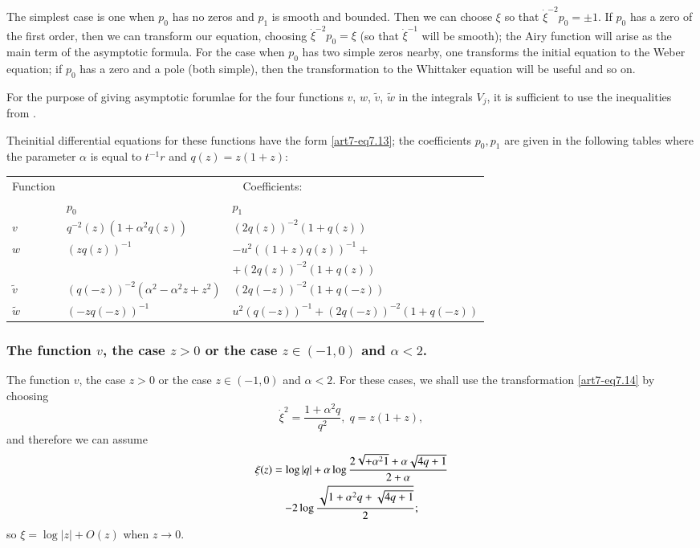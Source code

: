 The simplest case is one when $p_0$ has no zeros and $p_1$ is smooth and bounded. Then we can choose $\xi$ so that $\dot{\xi}^{-2}p_0 = \pm 1$. If $p_0$ has a zero of the first order, then we can transform our equation, choosing $\dot{\xi}^{-2} p_0 = \xi$ (so that $\dot{\xi}^{-1}$ will be smooth); the Airy function will arise as the main term of the asymptotic formula. For the case when $p_0$ has two simple zeros nearby, one transforms the initial equation to the Weber equation; if $p_0$ has a zero and a pole (both simple), then the transformation to the Whittaker equation will be useful and so on. 


For the purpose of giving asymptotic forumlae for the four functions $v$, $w$, $\tilde{v}$, $\tilde{w}$ in the integrals $V_j$, it is sufficient to use the inequalities from \cite{art7-key5}.

The\pageoriginale  initial differential equations for these functions have the form \eqref{art7-eq7.13}; the coefficients $p_0, p_1$ are given in the following tables where the parameter $\alpha$ is equal to $t^{-1} r$ and $q (z) = z (1+z)$:
\begin{center}
{\fontsize{10}{12}\selectfont
\renewcommand{\arraystretch}{1.2}
\tabcolsep=5pt
\begin{tabular}{|l|l|l|}
\hline
Function & \multicolumn{2}{c|}{Coefficients:}\\\cline{2-3}
& $p_0$ & $p_1$ \\\hline
$v$ & $q^{-2}(z) (1+\alpha^2 q (z))$ & $(2q (z))^{-2} (1+ q(z))$\\\hline
$w$ & $(z q(z))^{-1}$ & $-u^2 ((1+ z) q (z))^{-1} +$\\
& & $+ (2 q (z))^{-2} (1+ q(z))$\\\hline
$\tilde{v}$ & $(q(-z))^{-2} (\alpha^2 - \alpha^2 z + z^2)$ & $(2q (-z))^{-2} (1+ q (-z))$ \\\hline
$\tilde{w}$ & $(-zq (-z))^{-1}$ & $u^2 (q (-z))^{-1} + (2q (-z))^{-2} (1+ q (-z))$\\\hline
\end{tabular}}\relax
\end{center}

\setcounter{section}{2}
\subsubsection{The function $v$, the case $z>0$ or the case $z \in (-1,0)$ and $\alpha <2 $.}\label{art7-subsubsec2.6.3}
The function $v$, the case $z > 0$ or the case $z \in (-1,0)$ and $\alpha < 2$. For these cases, we shall use the transformation \eqref{art7-eq7.14} by choosing 
\setcounter{section}{7}
\setcounter{equation}{15}
\begin{equation}
\dot{\xi}^2 = \frac{1+ \alpha^2 q}{q^2} , \; q = z(1+z), \label{art7-eq7.16}
\end{equation}
and therefore we can assume
\begin{gather}
\xi(z) = \log  |q| + \alpha \log \frac{2\sqrt{+ \alpha^2 1} + \alpha \sqrt{4 q +1}}{2+\alpha} \label{art7-eq7.17}\\
- 2 \log \frac{\sqrt{1+ \alpha^2 q + \sqrt{4q+1}}}{2}; \notag
\end{gather}
so $\xi = \log |z| + O(z)$ when $z \to 0$.

